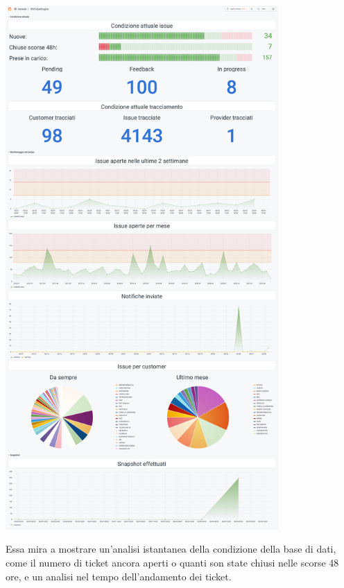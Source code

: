 			\begin{center}
				\includegraphics[keepaspectratio = true, height=20cm]{immagini/dashboard.png}
			\end{center}
			Essa mira a mostrare un'analisi istantanea della condizione della base di dati, come il numero di ticket ancora aperti o quanti son state chiusi nelle scorse 48 ore, e un analisi nel tempo dell'andamento dei ticket.
